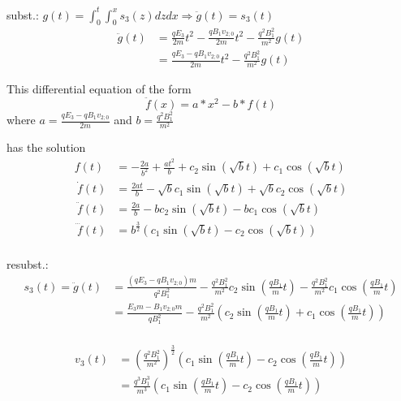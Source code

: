 \documentclass[a4paper, 10pt]{article}
\begin{document}
subst.: $g(t) = \int_0^t \int_0^x s_3(z) dz dx \Rightarrow \ddot{g}(t) = s_3(t)$
%
\begin{equation}
\begin{split}
\ddot{g}(t) 	&= \frac{q E_3}{2m} t^2 - \frac{q B_1 v_{2;0}}{2m} t^2 - \frac{q^2 B_1^2}{m^2} g(t) \\\
			&= \frac{q E_3 - q B_1 v_{2;0}}{2m} t^2 - \frac{q^2 B_1^2}{m^2} g(t)
\end{split}
\end{equation}

This differential equation of the form 
\begin{equation}
\ddot{f}(x) = a * x^2 - b * f(t)
\end{equation}
where $a=\frac{q E_3 - q B_1 v_{2;0}}{2m}$ and $b=\frac{q^2 B_1^2}{m^2}$

has the solution
\begin{equation}
\begin{split}
f(t) &= -\frac{2 a}{b^2} + \frac{a t^2}{b} + c_2 \sin\left(\sqrt{b} t\right) + c_1 \cos\left(\sqrt{b} t\right) \\\
\dot{f}(t) &= \frac{2 a t}{b} - \sqrt{b} c_1 \sin\left(\sqrt{b} t\right) + \sqrt{b} c_2 \cos\left(\sqrt{b} t\right) \\\
\ddot{f}(t) &= \frac{2 a}{b} - b c_2 \sin\left(\sqrt{b} t\right) - b c_1 \cos\left(\sqrt{b} t\right) \\\
\dddot{f}(t) &= b^{\frac{3}{2}} \left(c_1 \sin\left(\sqrt{b} t\right) - c_2 \cos\left(\sqrt{b} t\right)\right) \\\
\end{split}
\end{equation}

resubst.:
\begin{equation}
\begin{split}
s_3(t) = \ddot{g}(t) &= \frac{(q E_3 - q B_1 v_{2;0}) m}{q^2 B_1^2} - \frac{q^2 B_1^2}{m^2} c_2 \sin\left(\frac{q B_1}{m} t\right) - \frac{q^2 B_1^2}{m^2} c_1 \cos\left(\frac{q B_1}{m} t\right) \\\
&= \frac{E_3 m - B_1 v_{2;0} m}{q B_1^2} - \frac{q^2 B_1^2}{m^2} \left(c_2 \sin\left(\frac{q B_1}{m} t\right) + c_1 \cos\left(\frac{q B_1}{m} t\right)\right) \\\
\end{split}
\end{equation}

\begin{equation}
\begin{split}
v_3(t)  &= \left(\frac{q^2 B_1^2}{m^2}\right)^{\frac{3}{2}} \left(c_1 \sin\left(\frac{q B_1}{m} t\right) - c_2 \cos\left(\frac{q B_1}{m} t\right)\right) \\\
		&= \frac{q^3 B_1^3}{m^3} \left(c_1 \sin\left(\frac{q B_1}{m} t\right) - c_2 \cos\left(\frac{q B_1}{m} t\right)\right)
\end{split}
\end{equation}
\end{document}
